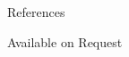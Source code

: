 \usepackage{enumitem}
\prefix{}
\begin{rubric}{References}

{\large Available on Request\par}
\end{rubric}